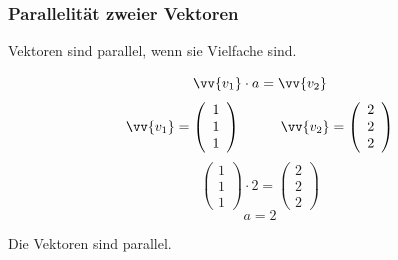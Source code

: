 \documentclass[a4paper, 15pt]{article}
\begin{document}
\subsubsection{Parallelität zweier Vektoren}
\begin{minipage}{.49\textwidth}
\begin{center}
Vektoren sind parallel, wenn sie Vielfache sind.
\end{center}
\begin{equation*}
\vv{v_1} \cdot a = \vv{v_2}
\end{equation*}
\begin{equation*}
\vv{v_1} = \left(\begin{array}{c} 1 \\ 1 \\ 1 \end{array}\right) \hspace{1cm} \vv{v_2} = \left(\begin{array}{c} 2 \\ 2 \\ 2 \end{array}\right)
\end{equation*}
\begin{equation*}
\left(\begin{array}{c} 1 \\ 1 \\ 1 \end{array}\right) \cdot 2 = \left(\begin{array}{c} 2 \\ 2 \\ 2 \end{array}\right)
\end{equation*}
\begin{equation*}
a = 2
\end{equation*}
\begin{center}
Die Vektoren sind parallel. 
\end{center}
\end{minipage}
\begin{minipage}{.49\textwidth}
\flushright
\begin{center}
\end{center}
\end{minipage}
\end{document}
